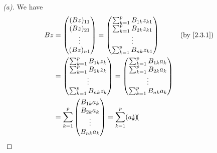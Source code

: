 \begin{proof}[(a)]
  We have
  \begin{align*}
    Bz & = \begin{pmatrix}
             (Bz)_{1 1} \\
             (Bz)_{2 1} \\
             \vdots     \\
             (Bz)_{n 1}
           \end{pmatrix} = \begin{pmatrix}
                             \sum_{k = 1}^p B_{1 k} z_{k 1} \\
                             \sum_{k = 1}^p B_{2 k} z_{k 1} \\
                             \vdots                         \\
                             \sum_{k = 1}^p B_{n k} z_{k 1}
                           \end{pmatrix}                      &  & \text{(by \cref{2.3.1})}                   \\
       & = \begin{pmatrix}
             \sum_{k = 1}^p B_{1 k} z_k \\
             \sum_{k = 1}^p B_{2 k} z_k \\
             \vdots                     \\
             \sum_{k = 1}^p B_{n k} z_k
           \end{pmatrix} = \begin{pmatrix}
                             \sum_{k = 1}^p B_{1 k} a_k \\
                             \sum_{k = 1}^p B_{2 k} a_k \\
                             \vdots                     \\
                             \sum_{k = 1}^p B_{n k} a_k
                           \end{pmatrix}                                                         \\
       & = \sum_{k = 1}^p \begin{pmatrix}
                            B_{1 k} a_k \\
                            B_{2 k} a_k \\
                            \vdots      \\
                            B_{n k} a_k
                          \end{pmatrix} = \sum_{k = 1}^p \pa{a_k \begin{pmatrix}

\end{pmatrix}}
\end{align*}
\end{proof}
